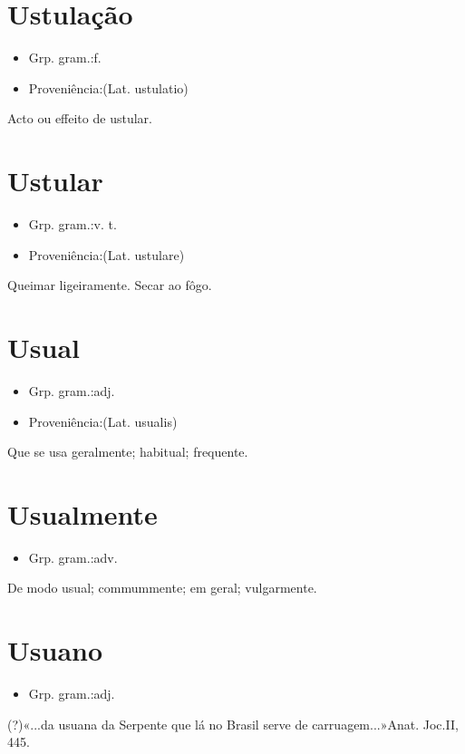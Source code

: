 \documentclass{article}
\begin{document}
\section{Ustulação}
\begin{itemize}
\item {Grp. gram.:f.}
\end{itemize}
\begin{itemize}
\item {Proveniência:(Lat. \textunderscore ustulatio\textunderscore )}
\end{itemize}
Acto ou effeito de ustular.
\section{Ustular}
\begin{itemize}
\item {Grp. gram.:v. t.}
\end{itemize}
\begin{itemize}
\item {Proveniência:(Lat. \textunderscore ustulare\textunderscore )}
\end{itemize}
Queimar ligeiramente.
Secar ao fôgo.
\section{Usual}
\begin{itemize}
\item {Grp. gram.:adj.}
\end{itemize}
\begin{itemize}
\item {Proveniência:(Lat. \textunderscore usualis\textunderscore )}
\end{itemize}
Que se usa geralmente; habitual; frequente.
\section{Usualmente}
\begin{itemize}
\item {Grp. gram.:adv.}
\end{itemize}
De modo usual; commummente; em geral; vulgarmente.
\section{Usuano}
\begin{itemize}
\item {Grp. gram.:adj.}
\end{itemize}
(?)«\textunderscore ...da usuana da Serpente que lá no Brasil serve de carruagem...\textunderscore »\textunderscore Anat. Joc.\textunderscore  II, 445.
\end{document}

